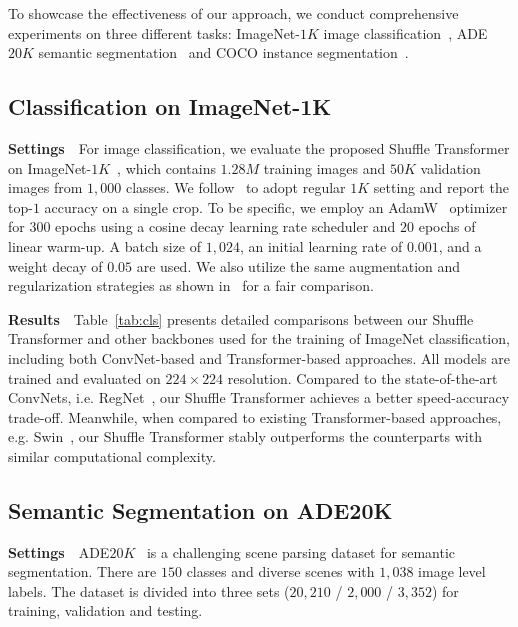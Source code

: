 \documentclass{article}
\begin{document}
To showcase the effectiveness of our approach, we conduct comprehensive experiments on three different tasks: ImageNet-$1K$ image classification~\citep{deng2009imagenet}, ADE$20K$ semantic segmentation~\cite{zhou2017scene} and COCO instance segmentation~\cite{lin2014microsoft}. 



\subsection{Classification on ImageNet-1K}
\textbf{Settings}~~For image classification, we evaluate the proposed Shuffle Transformer on ImageNet-$1K$~\cite{deng2009imagenet}, which contains $1.28M$ training images and $50K$ validation images from $1,000$ classes. We follow~\cite{liu2021Swin} to adopt regular $1K$ setting and report the top-$1$ accuracy on a single crop.
To be specific, we employ an AdamW~\cite{loshchilov2017decoupled} optimizer for $300$ epochs using a cosine decay learning rate scheduler and $20$ epochs of linear warm-up. A batch size of $1,024$, an initial learning rate of $0.001$, and a weight decay of $0.05$ are used. We also utilize the same augmentation and regularization strategies as shown in~\cite{liu2021Swin} for a fair comparison.



\textbf{Results}~~Table~\ref{tab:cls} presents detailed comparisons between our Shuffle Transformer and other backbones used for the training of ImageNet classification, including both ConvNet-based and Transformer-based approaches. All models are trained and evaluated on $224\times224$ resolution. Compared to the state-of-the-art ConvNets, i.e. RegNet~\cite{radosavovic2020designing}, our Shuffle Transformer achieves a better speed-accuracy trade-off. Meanwhile, when compared to existing Transformer-based approaches, e.g. Swin~\cite{liu2021Swin}, our Shuffle Transformer stably outperforms the counterparts with similar computational complexity.





\subsection{Semantic Segmentation on ADE20K}
\textbf{Settings}~~ADE$20K$~\cite{zhou2017scene} is a challenging scene parsing dataset for semantic segmentation. There are $150$ classes and diverse scenes with $1,038$ image level labels. The dataset is divided into three sets ($20,210$ / $2,000$ / $3,352$) for training, validation and testing. 
\end{document}
